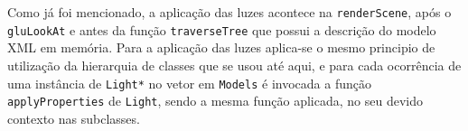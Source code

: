 Como já foi mencionado, a aplicação das luzes acontece na \texttt{renderScene},
após o \texttt{gluLookAt} e antes da função \texttt{traverseTree} que possui
a descrição do modelo XML em memória. Para a aplicação das luzes aplica-se
o mesmo principio de utilização da hierarquia de classes que se usou até aqui,
e para cada ocorrência de uma instância de \texttt{Light*} no vetor em
\texttt{Models} é invocada a função \texttt{applyProperties} de \texttt{Light},
sendo a mesma função aplicada, no seu devido contexto nas subclasses.


